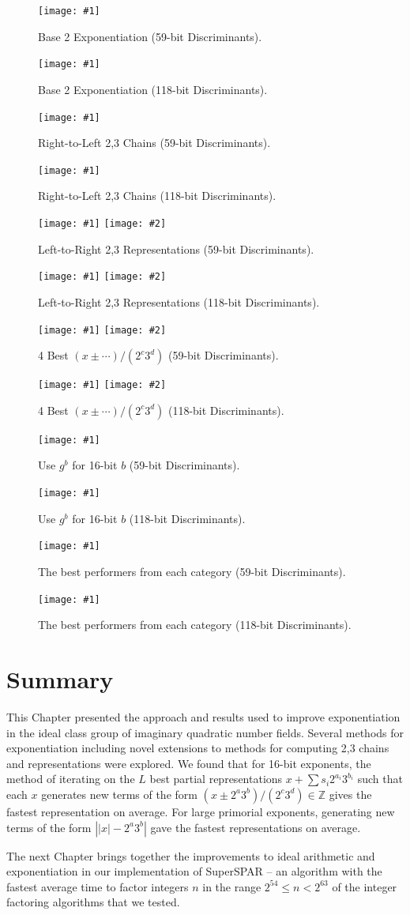 \documentclass{ucalgthes1}
\theoremstyle{definition}
\newcommand{\ZZ}{\mathbb{Z}}
\newcommand{\mygraph}[3]{
	\begin{figure}[H]
	\centering
	\texttt{[image: \#1]}
	\caption{#3}
	\label{#2}
	\end{figure}
}
\newcommand{\mygraphTwo}[4]{
	\begin{figure}[H]
	\centering
	\texttt{[image: \#1]}
	\texttt{[image: \#2]}
	\caption{#4}
	\label{#3}
	\end{figure}
}
\begin{document}
\mygraph{binary_vs_naf-64}{fig:expBinNaf64}{Base 2 Exponentiation (59-bit Discriminants).}
\mygraph{binary_vs_naf-128}{fig:expBinNaf128}{Base 2 Exponentiation (118-bit Discriminants).}

\mygraph{dbns_r2ls-64}{fig:expDbnsR2L64}{Right-to-Left 2,3 Chains (59-bit Discriminants).}
\mygraph{dbns_r2ls-128}{fig:expDbnsR2L128}{Right-to-Left 2,3 Chains (118-bit Discriminants).}

\mygraphTwo{dbns_l2rs-64}{dbns_l2rs-64-zoom}{fig:expDbnsL2R64}{Left-to-Right 2,3 Representations (59-bit Discriminants).}
\mygraphTwo{dbns_l2rs-128}{dbns_l2rs-128-zoom}{fig:expDbnsL2R128}{Left-to-Right 2,3 Representations (118-bit Discriminants).}

\mygraphTwo{pm_variants-64}{pm_variants-64-zoom}{fig:expPmVariants64}{4 Best $(x\pm\cdots)/(2^c3^d)$ (59-bit Discriminants).}
\mygraphTwo{pm_variants-128}{pm_variants-128-zoom}{fig:expPmVariants128}{4 Best $(x\pm\cdots)/(2^c3^d)$ (118-bit Discriminants).}

\mygraph{block_vs_list-64}{fig:expBlockList64}{Use $g^b$ for 16-bit $b$ (59-bit Discriminants).}
\mygraph{block_vs_list-128}{fig:expBlockList128}{Use $g^b$ for 16-bit $b$ (118-bit Discriminants).}

\mygraph{winners-64}{fig:expWinners64}{The best performers from each category (59-bit Discriminants).}
\mygraph{winners-128}{fig:expWinners128}{The best performers from each category (118-bit Discriminants).}


\section{Summary}

This Chapter presented the approach and results used to improve exponentiation in the ideal class group of imaginary quadratic number fields.  Several methods for exponentiation including novel extensions to methods for computing 2,3 chains and representations were explored.  We found that for 16-bit exponents, the method of iterating on the $L$ best partial representations $x + \sum s_i2^{a_i}3^{b_i}$ such that each $x$ generates new terms of the form $(x \pm 2^a 3^b)/(2^c3^d) \in \ZZ$ gives the fastest representation on average.  For large primorial exponents, generating new terms of the form $\left||x|-2^a3^b\right|$ gave the fastest representations on average.

The next Chapter brings together the improvements to ideal arithmetic and exponentiation in our implementation of SuperSPAR -- an algorithm with the fastest average time to factor integers $n$ in the range $2^{54} \le n < 2^{63}$ of the integer factoring algorithms that we tested.
\end{document}

